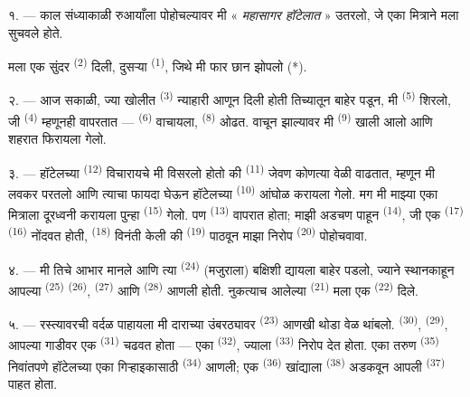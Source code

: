 
\VUsaut{3.0mm}
\VUsaut{1.6mm}
\VUsaut{2.0mm}
\VUsaut{3.4mm}

१. --- काल संध्याकाळी रुआयाँला पोहोचल्यावर मी « \textit{महासागर हॉटेलात} » उतरलो, जे एका
मित्राने मला सुचवले होते.

मला एक सुंदर  \textsuperscript{(2)} दिली, दुसऱ्या 
\textsuperscript{(1)}, जिथे मी फार छान झोपलो (*).

२. --- आज सकाळी, ज्या खोलीत  \textsuperscript{(3)} न्याहारी आणून दिली होती
तिच्यातून बाहेर पडून, मी  \textsuperscript{(5)} शिरलो, जी
 \textsuperscript{(4)} म्हणूनही वापरतात — 
\textsuperscript{(6)} वाचायला,  \textsuperscript{(8)} ओढत. वाचून झाल्यावर मी
 \textsuperscript{(9)} खाली आलो आणि शहरात फिरायला गेलो.

३. --- हॉटेलच्या  \textsuperscript{(12)} विचारायचे मी विसरलो होतो की
 \textsuperscript{(11)} जेवण कोणत्या वेळी वाढतात, म्हणून मी
लवकर परतलो आणि त्याचा फायदा घेऊन हॉटेलच्या  \textsuperscript{(10)} आंघोळ
करायला गेलो. मग मी माझ्या एका मित्राला दूरध्वनी करायला पुन्हा 
\textsuperscript{(15)} गेलो. पण  \textsuperscript{(13)} वापरात होता; माझी
अडचण पाहून  \textsuperscript{(14)}, जी एक 
\textsuperscript{(17)}  \textsuperscript{(16)} नोंदवत होती,
 \textsuperscript{(18)} विनंती केली की 
\textsuperscript{(19)} पाठवून माझा निरोप  \textsuperscript{(20)} पोहोचवावा.

४. --- मी तिचे आभार मानले आणि त्या  \textsuperscript{(24)} (मजुराला) बक्षिशी
द्यायला बाहेर पडलो, ज्याने स्थानकाहून आपल्या  \textsuperscript{(25)}
 \textsuperscript{(26)},  \textsuperscript{(27)}
आणि  \textsuperscript{(28)} आणली होती. नुकत्याच आलेल्या
 \textsuperscript{(21)} मला एक  \textsuperscript{(22)}
दिले.

५. --- रस्त्यावरची वर्दळ पाहायला मी दाराच्या उंबरठ्यावर 
\textsuperscript{(23)} आणखी थोडा वेळ थांबलो.  \textsuperscript{(30)},
 \textsuperscript{(29)}, आपल्या गाडीवर एक 
\textsuperscript{(31)} चढवत होता — एका  \textsuperscript{(32)}, ज्याला
 \textsuperscript{(33)} निरोप देत होता. एका तरुण 
\textsuperscript{(35)} निवांतपणे हॉटेलच्या एका गिऱ्हाइकासाठी 
\textsuperscript{(34)} आणली; एक  \textsuperscript{(36)} खांद्याला
 \textsuperscript{(38)} अडकवून आपली 
\textsuperscript{(37)} पाहत होता.

